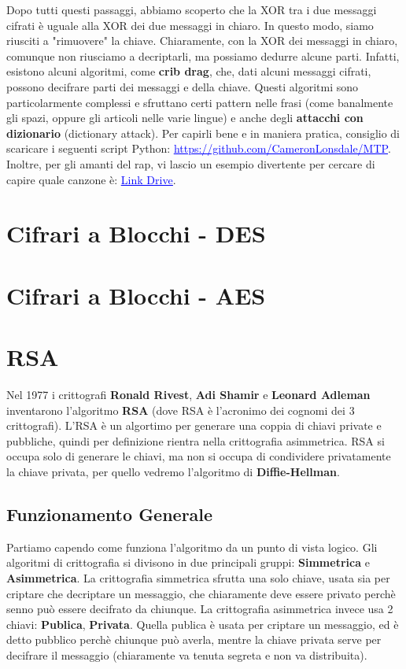 \documentclass{rapport}
\begin{document}
Dopo tutti questi passaggi, abbiamo scoperto che la XOR tra i due messaggi cifrati è uguale alla XOR dei due messaggi in chiaro. In questo modo, siamo riusciti a "rimuovere" la chiave. Chiaramente, con la XOR dei messaggi in chiaro, comunque non riusciamo a decriptarli, ma possiamo dedurre alcune parti. Infatti, esistono alcuni algoritmi, come \textbf{crib drag}, che, dati alcuni messaggi cifrati, possono decifrare parti dei messaggi e della chiave. Questi algoritmi sono particolarmente complessi e sfruttano certi pattern nelle frasi (come banalmente gli spazi, oppure gli articoli nelle varie lingue) e anche degli \textbf{attacchi con dizionario} (dictionary attack). Per capirli bene e in maniera pratica, consiglio di scaricare i seguenti script Python: \href{https://github.com/CameronLonsdale/MTP}{\textcolor{blue}{\underline{https://github.com/CameronLonsdale/MTP}}}. Inoltre, per gli amanti del rap, vi lascio un esempio divertente per cercare di capire quale canzone è: \href{https://drive.google.com/file/d/1TlU_iIYm5XfBpwMUKk1Ko-MEZ41LIxuF/view?usp=sharing}{\textcolor{blue}{\underline{Link Drive}}}.



\newpage
\section{Cifrari a Blocchi - DES}


\section{Cifrari a Blocchi - AES}



\newpage
\section{RSA}
Nel 1977 i crittografi \textbf{Ronald Rivest}, \textbf{Adi Shamir} e \textbf{Leonard Adleman} inventarono l'algoritmo \textbf{RSA} (dove RSA è l'acronimo dei cognomi dei 3 crittografi). L'RSA è un algortimo per generare una coppia di chiavi private e pubbliche, quindi per definizione rientra nella crittografia asimmetrica. RSA si occupa solo di generare le chiavi, ma non si occupa di condividere privatamente la chiave privata, per quello vedremo l'algoritmo di \textbf{Diffie-Hellman}.


\subsection{Funzionamento Generale}
Partiamo capendo come funziona l'algoritmo da un punto di vista logico. Gli algoritmi di crittografia si divisono in due principali gruppi: \textbf{Simmetrica} e \textbf{Asimmetrica}. La crittografia simmetrica sfrutta una solo chiave, usata sia per criptare che decriptare un messaggio, che chiaramente deve essere privato perchè senno può essere decifrato da chiunque. La crittografia asimmetrica invece usa 2 chiavi: \textbf{Publica}, \textbf{Privata}. Quella publica è usata per criptare un messaggio, ed è detto pubblico perchè chiunque può averla, mentre la chiave privata serve per decifrare il messaggio (chiaramente va tenuta segreta e non va distribuita). 
\end{document}
